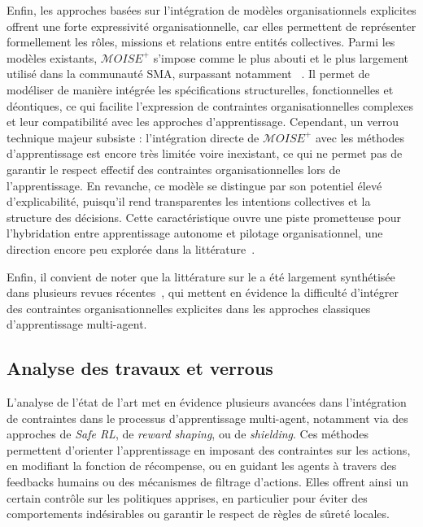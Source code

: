 Enfin, les approches basées sur l’intégration de modèles organisationnels explicites offrent une forte expressivité organisationnelle, car elles permettent de représenter formellement les rôles, missions et relations entre entités collectives. Parmi les modèles existants, $\mathcal{M}OISE^+$ s’impose comme le plus abouti et le plus largement utilisé dans la communauté SMA, surpassant notamment ~\cite{Ferber2004}. Il permet de modéliser de manière intégrée les spécifications structurelles, fonctionnelles et déontiques, ce qui facilite l’expression de contraintes organisationnelles complexes et leur compatibilité avec les approches d’apprentissage.
%
Cependant, un verrou technique majeur subsiste : l’intégration directe de $\mathcal{M}OISE^+$ avec les méthodes d’apprentissage est encore très limitée voire inexistant, ce qui ne permet pas de garantir le respect effectif des contraintes organisationnelles lors de l’apprentissage. En revanche, ce modèle se distingue par son potentiel élevé d’explicabilité, puisqu’il rend transparentes les intentions collectives et la structure des décisions. Cette caractéristique ouvre une piste prometteuse pour l’hybridation entre apprentissage autonome et pilotage organisationnel, une direction encore peu explorée dans la littérature~\cite{bordini2006jade, chernova2014robot}.

\medskip

\noindent
Enfin, il convient de noter que la littérature sur le  a été largement synthétisée dans plusieurs revues récentes~\cite{Zhang2021, Papoudakis2021}, qui mettent en évidence la difficulté d’intégrer des contraintes organisationnelles explicites dans les approches classiques d’apprentissage multi-agent.

\subsection*{Analyse des travaux et verrous}

L’analyse de l’état de l’art met en évidence plusieurs avancées dans l’intégration de contraintes dans le processus d’apprentissage multi-agent, notamment via des approches de \textit{Safe RL}, de \textit{reward shaping}, ou de \textit{shielding}. Ces méthodes permettent d’orienter l’apprentissage en imposant des contraintes sur les actions, en modifiant la fonction de récompense, ou en guidant les agents à travers des feedbacks humains ou des mécanismes de filtrage d’actions. Elles offrent ainsi un certain contrôle sur les politiques apprises, en particulier pour éviter des comportements indésirables ou garantir le respect de règles de sûreté locales.

